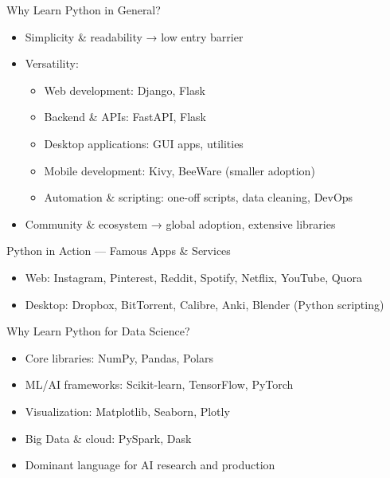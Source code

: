 \documentclass[12pt, aspectratio=169]{beamer}
\begin{document}
    \begin{frame}{Why Learn Python in General?}
        \begin{itemize}
            \item Simplicity \& readability → low entry barrier
            \item Versatility:
            \begin{itemize}
                \item Web development: Django, Flask
                \item Backend \& APIs: FastAPI, Flask
                \item Desktop applications: GUI apps, utilities
                \item Mobile development: Kivy, BeeWare (smaller adoption)
                \item Automation \& scripting: one-off scripts, data cleaning, DevOps
            \end{itemize}
            \item Community \& ecosystem → global adoption, extensive libraries
        \end{itemize}
    \end{frame}


    \begin{frame}{Python in Action — Famous Apps \& Services}
        \begin{itemize}
            \item Web: Instagram, Pinterest, Reddit, Spotify, Netflix, YouTube, Quora
            \item Desktop: Dropbox, BitTorrent, Calibre, Anki, Blender (Python scripting)
        \end{itemize}
    \end{frame}


    \begin{frame}{Why Learn Python for Data Science?}
        \begin{itemize}
            \item Core libraries: NumPy, Pandas, Polars
            \item ML/AI frameworks: Scikit-learn, TensorFlow, PyTorch
            \item Visualization: Matplotlib, Seaborn, Plotly
            \item Big Data \& cloud: PySpark, Dask
            \item Dominant language for AI research and production
        \end{itemize}
    \end{frame}
\end{document}
